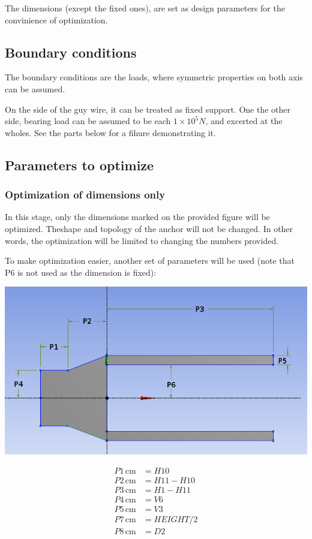 \documentclass[a4paper,14pt]{extarticle}
\newcommand{\cm}{\,\si{\centi\meter}}
\begin{document}
The dimensions (except the fixed ones), are set as design parameters for the convinience of optimization.
\subsection{Boundary conditions}
The boundary conditions are the loads, where symmetric properties on both axis can be assumed.

On the side of the guy wire, it can be treated as fixed support. One the other side, bearing load can be assumed to be each $1\times10^5 N$, and excerted at the wholes. See the parts below for a fihure demonstrating it.
\subsection{Parameters to optimize}
\subsubsection{Optimization of dimensions only}
In this stage, only the dimensions marked on the provided figure will be optimized. Theshape and topology of the anchor will not be changed. In other words, the optimization will be limited to changing the numbers provided.

To make optimization easier, another set of parameters will be used (note that P6 is not used as the dimension is fixed):

\includegraphics[width=\textwidth]{singleParam/NEW_DIM.PNG}

\begin{align*}
P1 \cm &= H10\\
P2 \cm &= H11-H10\\
P3 \cm &= H1-H11\\
P4 \cm &= V6\\
P5 \cm &= V3\\
P7 \cm &= HEIGHT / 2\\
P8 \cm &= D2
\end{align*}
\end{document}
